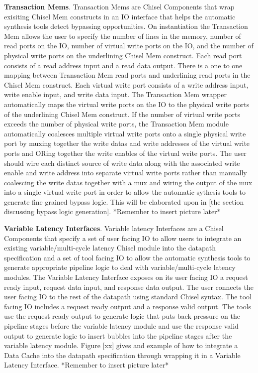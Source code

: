 {\bf Transaction Mems}. Transaction Mems are Chisel Components that wrap exisiting Chisel Mem constructs in an IO interface that helps the automatic synthesis tools detect bypassing opportunities. On instantiation the Transaction Mem allows the user to specify the number of lines in the memory, number of read ports on the IO, number of virtual write ports on the IO, and the number of physical write ports on the underlining Chisel Mem construct. Each read port consists of a read address input and a read data output. There is a one to one mapping between Transaction Mem read ports and underlining read ports in the Chisel Mem construct. Each virtual write port consists of a write address input, write enable input, and write data input. The Transaction Mem wrapper automatically maps the virtual write ports on the IO to the physical write ports of the underlining Chisel Mem construct. If the number of virtual write ports exceeds the number of physical write ports, the Transaction Mem module automatically coalesces multiple virtual write ports onto a single physical write port by muxing together the write datas and write addresses of the virtual write ports and ORing together the write enables of the virtual write ports. The user should wire each distinct source of write data along with the associated write enable and write address into separate virtual write ports rather than manually coalescing the write datas together with a mux and wiring the output of the mux into a single virtual write port in order to allow the automatic sythesis tools to generate fine grained bypass logic. This will be elaborated upon in [the section discussing bypass logic generation]. *Remember to insert picture later* 

{\bf Variable Latency Interfaces}. Variable latency Interfaces are a Chisel Components that specify a set of user facing IO to allow users to integrate an existing variable/multi-cycle latency Chisel module into the datapath specification and a set of tool facing IO to allow the automatic synthesis tools to generate appropriate pipeline logic to deal with variable/multi-cycle latency modules. The Variable Latency Interface exposes on its user facing IO a request ready input, request data input, and response data output. The user connects the user facing IO to the rest of the datapath using standard Chisel syntax. The tool facing IO includes a request ready output and a response valid output. The tools use the request ready output to generate logic that puts back pressure on the pipeline stages before the variable latency module and use the response valid output to generate logic to insert bubbles into the pipeline stages after the variable latency module. Figure [xx] gives and example of how to integrate a Data Cache into the datapath specification through wrapping it in a Variable Latency Interface. *Remember to insert picture later* 

